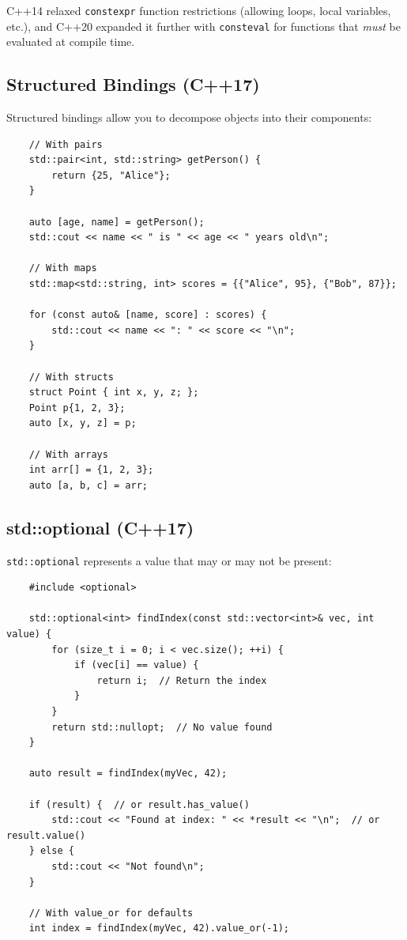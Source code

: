 \begin{remark}
	C++14 relaxed \texttt{constexpr} function restrictions (allowing loops, local variables, etc.), and C++20 expanded it further with \texttt{consteval} for functions that \textit{must} be evaluated at compile time.
\end{remark}

\subsection{Structured Bindings (C++17)}

Structured bindings allow you to decompose objects into their components:

\begin{lstlisting}
	// With pairs
	std::pair<int, std::string> getPerson() {
		return {25, "Alice"};
	}
	
	auto [age, name] = getPerson();
	std::cout << name << " is " << age << " years old\n";
	
	// With maps
	std::map<std::string, int> scores = {{"Alice", 95}, {"Bob", 87}};
	
	for (const auto& [name, score] : scores) {
		std::cout << name << ": " << score << "\n";
	}
	
	// With structs
	struct Point { int x, y, z; };
	Point p{1, 2, 3};
	auto [x, y, z] = p;
	
	// With arrays
	int arr[] = {1, 2, 3};
	auto [a, b, c] = arr;
\end{lstlisting}

\subsection{std::optional (C++17)}

\texttt{std::optional} represents a value that may or may not be present:

\begin{lstlisting}
	#include <optional>
	
	std::optional<int> findIndex(const std::vector<int>& vec, int value) {
		for (size_t i = 0; i < vec.size(); ++i) {
			if (vec[i] == value) {
				return i;  // Return the index
			}
		}
		return std::nullopt;  // No value found
	}
	
	auto result = findIndex(myVec, 42);
	
	if (result) {  // or result.has_value()
		std::cout << "Found at index: " << *result << "\n";  // or result.value()
	} else {
		std::cout << "Not found\n";
	}
	
	// With value_or for defaults
	int index = findIndex(myVec, 42).value_or(-1);
\end{lstlisting}

